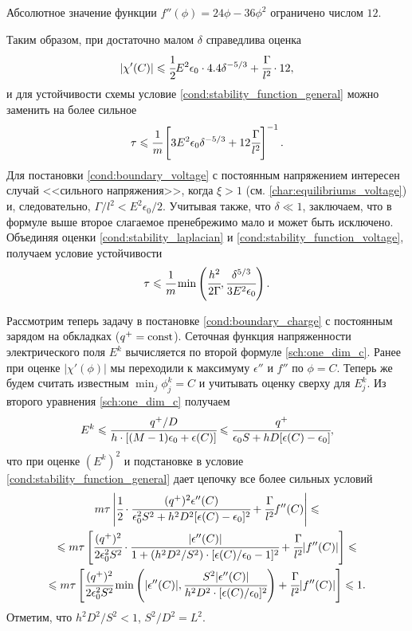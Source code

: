 Абсолютное значение функции $f''(\phi) = 24 \phi - 36 \phi^2$ ограничено числом $12$.

Таким образом, при достаточно малом $\delta$ справедлива оценка
\[
    | \chi'(C) | \leqslant \cfrac{1}{2} E^2 \epsilon_0 \cdot 4.4 \delta^{-5/3} + \cfrac{\Gamma}{l^2} \cdot 12,
\]
и для устойчивости схемы условие \eqref{cond:stability_function_general} можно заменить на более сильное
\begin{equation}
    \tau \leqslant \cfrac{1}{m} \left[ 3 E^2 \epsilon_0 \delta^{-5/3} + 12 \cfrac{\Gamma}{l^2} \right]^{-1}.
    \label{cond:stability_function_voltage}
\end{equation}
Для постановки \eqref{cond:boundary_voltage} с постоянным напряжением интересен случай <<сильного напряжения>>, когда $\xi > 1$ (см. \eqref{char:equilibriums_voltage}) и, следовательно, $\Gamma / l^2 < E^2 \epsilon_0 / 2$. Учитывая также, что $\delta \ll 1$, заключаем, что в формуле выше второе слагаемое пренебрежимо мало и может быть исключено. Объединяя оценки \eqref{cond:stability_laplacian} и \eqref{cond:stability_function_voltage}, получаем условие устойчивости
\begin{equation}
    \tau \leqslant \cfrac{1}{m} \min \left( \cfrac{h^2}{2 \Gamma}, \cfrac{\delta^{5/3}}{3 E^2 \epsilon_0} \right).
    \label{cond:stability_voltage}
\end{equation}

Рассмотрим теперь задачу в постановке \eqref{cond:boundary_charge} с постоянным зарядом на обкладках ($q^+ = \operatorname{{const}}$). Сеточная функция напряженности электрического поля $E^k$ вычисляется по второй формуле \eqref{sch:one_dim_c}. Ранее при оценке $| \chi'(\phi) |$ мы переходили к максимуму $\epsilon''$ и $f''$ по $\phi = C$. Теперь же будем считать известным $\min_j \phi_j^k = C$ и учитывать оценку сверху для $E_j^k$. Из второго уравнения \eqref{sch:one_dim_c} получаем
\begin{equation}
    E^k \leqslant \cfrac{q^+/D}{h \cdot [(M - 1) \epsilon_0 + \epsilon(C)]} \leqslant \cfrac{q^+}{\epsilon_0 S + h D [\epsilon(C) - \epsilon_0]},
    \label{tmp:voltage_estimate}
\end{equation}
что при оценке $(E^k)^2$ и подстановке в условие \eqref{cond:stability_function_general} дает цепочку все более сильных условий
\begin{multline}
    m \tau \left| \cfrac{1}{2} \cdot \cfrac{(q^+)^2 \epsilon''(C)}{\epsilon_0^2 S^2 + h^2 D^2 [\epsilon(C) - \epsilon_0]^2} + \cfrac{\Gamma}{l^2} f''(C) \right| \leqslant \\ \leqslant m \tau \left[ \cfrac{(q^+)^2}{2 \epsilon_0^2 S^2} \cdot \cfrac{|\epsilon''(C)|}{1 + (h^2 D^2 / S^2) \cdot [\epsilon(C) / \epsilon_0 - 1]^2} + \cfrac{\Gamma}{l^2} |f''(C)| \right] \leqslant \\ \leqslant m \tau \left[ \cfrac{(q^+)^2}{2 \epsilon_0^2 S^2} \min \left( |\epsilon''(C)|, \cfrac{S^2 |\epsilon''(C)|}{h^2 D^2 \cdot [\epsilon(C) / \epsilon_0]^2} \right) + \cfrac{\Gamma}{l^2} |f''(C)| \right] \leqslant 1.
    \label{tmp:stability_function}
\end{multline}
Отметим, что $h^2 D^2 / S^2 < 1$, $S^2 / D^2 = L^2$.

